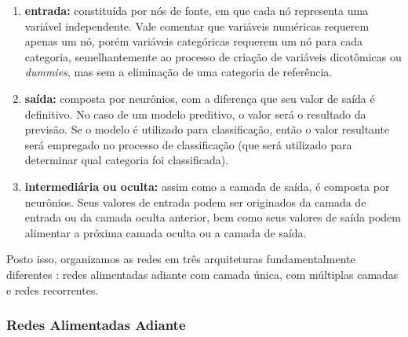 \documentclass{automatextcc}
\newcommand{\bs}[1]{\boldsymbol{#1}}
\begin{document}
\begin{enumerate}
    \item \textbf{entrada:} constituída por nós de fonte, em que cada nó representa uma variável independente. Vale comentar que variáveis numéricas requerem apenas um nó, porém variáveis categóricas requerem um nó para cada categoria, semelhantemente ao processo de criação de variáveis dicotômicas ou \textit{dummies}, mas sem a eliminação de uma categoria de referência.
    \item \textbf{saída:} composta por neurônios, com a diferença que seu valor de saída é definitivo. No caso de um modelo preditivo, o valor será o resultado da previsão. Se o modelo é utilizado para classificação, então o valor resultante será empregado no processo de classificação (que será utilizado para determinar qual categoria foi classificada).
    \item \textbf{intermediária ou oculta:} assim como a camada de saída, é composta por neurônios. Seus valores de entrada podem ser originados da camada de entrada ou da camada oculta anterior, bem como seus valores de saída podem alimentar a próxima camada oculta ou a camada de saída.
\end{enumerate}
Posto isso, organizamos as redes em três arquiteturas fundamentalmente diferentes \citep{hair2005,haykin2009,hagan2014}: redes alimentadas adiante com camada única, com múltiplas camadas e redes recorrentes.


\subsubsection{Redes Alimentadas Adiante}


\end{document}
